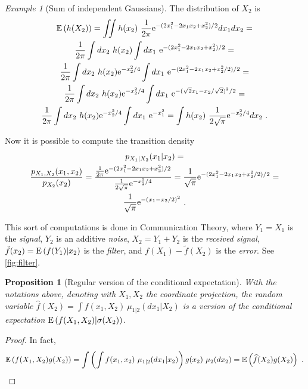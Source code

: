 \documentclass[12pt,a4paper]{amsart}
\theoremstyle{plain}%
\newtheorem{proposition}[thm]{Proposition}
\theoremstyle{definition}
\theoremstyle{remark}
\newtheorem{example}{Example}
\begin{document}
\begin{example}[Sum of independent Gaussians]
The distribution of $X_2$ is
\begin{multline*}
  \operatorname{\mathbb E}\left(h(X_2)\right) = \iint h(x_2) \ \frac1{2\pi} \mathrm{e}^{-(2x_1^2
    -2x_1x_2 + x_2^2)/2}dx_1dx_2 = \\ \frac1{2\pi}\int dx_2 \ h(x_2)
  \int dx_1 \ \mathrm{e}^{-(2x_1^2 -2x_1x_2 + x_2^2)/2} = \\ \frac1{2\pi} \int
  dx_2 \ h(x_2) \mathrm{e}^{-x_2^2/4} \int dx_1 \ \mathrm{e}^{-(2x_1^2 -2x_1x_2 +
    x_2^2/2)/2} = \\  \frac1{2\pi} \int
  dx_2 \ h(x_2) \mathrm{e}^{-x_2^2/4} \int dx_1 \ \mathrm{e}^{-(\sqrt 2 x_1 -
    x_2/\sqrt 2)^2/2} = \\ \frac1{2\pi} \int
  dx_2 \ h(x_2) \mathrm{e}^{-x_2^2/4} \int dx_1 \ \mathrm{e}^{-x_1^2} = \int
  h(x_2) \ \frac1{2\sqrt \pi} \mathrm{e}^{-x_2^2/4} dx_2 \ .  
\end{multline*}

Now it is possible to compute the transition density
\begin{multline*}
  p_{X_1|X_2}(x_1|x_2) = \\ \frac{p_{X_1,X_2}(x_1,x_2)}{p_{X_2}(x_2)} =
  \frac{\frac1{2\pi}
  \mathrm{e}^{-(2x_1^2 -2x_1x_2 + x_2^2)/2}}{\frac1{2\sqrt \pi}
  \mathrm{e}^{-x_2^2/4}} = \frac1{\sqrt{\pi}} \mathrm{e}^{-(2x_1^2 -2x_1x_2 +
    x_2^2/2)/2} = \\ \frac1{\sqrt{\pi}} \mathrm{e}^{-(x_1-x_2/2)^2} \ .
\end{multline*}

This sort of computations is done in Communication Theory, where $Y_1=X_1$
is the \emph{signal}, $Y_2$ is an additive \emph{noise}, $X_2 =
Y_1+Y_2$ is the \emph{received signal}, $\tilde f (x_2) = \operatorname{E}\left(f(Y_1) \middle| x_2\right)$ is the \emph{filter}, and $f(X_1) - \tilde f(X_2)$ is
the \emph{error}. See \cref{fig:filter}.
\end{example}


\begin{proposition}[Regular version of the conditional expectation]
With the notations above, denoting with $X_1,X_2$ the coordinate
projection, the random variable $\widehat f(X_2) = \int f(x_1,X_2) \
\mu_{1|2}(dx_1|X_2)$ is a version of the conditional expectation
$\operatorname{E}\left(f(X_1,X_2) \middle| \sigma(X_2)\right)$.
\end{proposition}

\begin{proof}
  In fact,
  \begin{equation*}
    \expectof {f(X_1,X_2)g(X_2)} = \int \left(\int f(x_1,x_2) \ \mu_{1|2}(dx_1|x_2)\right)g(x_2) \ \mu_2(dx_2) = \expectof {\widehat f(X_2)g(X_2)} \ .
  \end{equation*}
\end{proof}  
\end{document}
